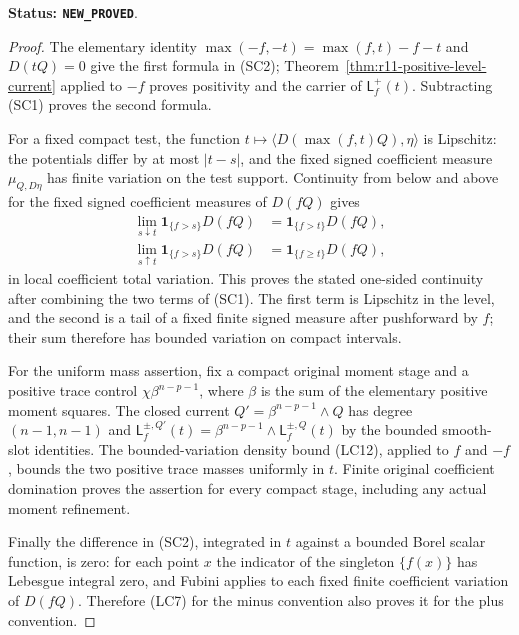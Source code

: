 \documentclass[11pt,a4paper]{article}
\numberwithin{equation}{section}
\theoremstyle{definition}
\theoremstyle{remark}
\begin{document}
\noindent\textbf{Status: \texttt{NEW\_PROVED}}.

\begin{proof}
The elementary identity
$\max(-f,-t)=\max(f,t)-f-t$ and $D(tQ)=0$ give the first
formula in (SC2); Theorem~\ref{thm:r11-positive-level-current}
applied to $-f$ proves positivity and the carrier of
$\mathsf L_f^{+}(t)$.  Subtracting (SC1) proves the second formula.

For a fixed compact test, the function
$t\mapsto\langle D(\max(f,t)Q),\eta\rangle$ is Lipschitz:
the potentials differ by at most $|t-s|$, and the fixed signed
coefficient measure $\mu_{Q,D\eta}$ has finite variation on the
test support.  Continuity from below and above for the fixed
signed coefficient measures of $D(fQ)$ gives
\[
 \begin{split}
 \lim_{s\downarrow t}\mathbf1_{\{f>s\}}D(fQ)
       &=\mathbf1_{\{f>t\}}D(fQ),\\
 \lim_{s\uparrow t}\mathbf1_{\{f>s\}}D(fQ)
       &=\mathbf1_{\{f\geq t\}}D(fQ),
 \end{split}
\]
in local coefficient total variation.  This proves the stated
one-sided continuity after combining the two terms of (SC1).
The first term is Lipschitz in the level, and the second is a
tail of a fixed finite signed measure after pushforward by $f$;
their sum therefore has bounded variation on compact intervals.

For the uniform mass assertion, fix a compact original moment
stage and a positive trace control $\chi\beta^{n-p-1}$, where
$\beta$ is the sum of the elementary positive moment squares.
The closed current $Q'=\beta^{n-p-1}\wedge Q$ has degree
$(n-1,n-1)$ and
$\mathsf L_f^{\pm,Q'}(t)=\beta^{n-p-1}\wedge
\mathsf L_f^{\pm,Q}(t)$ by the bounded smooth-slot identities.
The bounded-variation density bound (LC12), applied to $f$ and
$-f$, bounds the two positive trace masses uniformly in $t$.
Finite original coefficient domination proves the assertion for
every compact stage, including any actual moment refinement.

Finally the difference in (SC2), integrated in $t$ against a
bounded Borel scalar function, is zero: for each point $x$ the
indicator of the singleton $\{f(x)\}$ has Lebesgue integral
zero, and Fubini applies to each fixed finite coefficient
variation of $D(fQ)$.  Therefore (LC7) for the minus convention
also proves it for the plus convention.
\end{proof}
\end{document}
